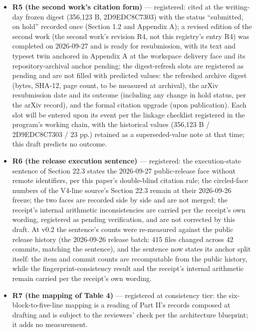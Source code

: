 \documentclass[11pt]{article}
\begin{document}
\begin{itemize}[leftmargin=1.6em,itemsep=2pt,parsep=0pt,topsep=3pt]
citations (E-40.1, E-40.2). The registration follows the R1–R3 precedent of concise, registered facts: the source documents are not transcribed, none of them enters the References, and the confidential-source discipline of C.4 is unaffected—the calibration note and the weekly-report family remain outside the citation surface, carried by fingerprint only.
\item \textbf{R5 (the second work's citation form)} — registered: cited at the writing-day frozen digest (356,123 B, 2D9EDC8C7303) with the status ``submitted, on hold'' recorded once (Section 1.2 and Appendix A); a revised edition of the second work (the second work's revision R4, not this registry's entry R4) was completed on 2026-09-27 and is ready for resubmission, with its text and typeset twin anchored in Appendix A at the workspace delivery face and its repository-archival anchor pending; the digest-refresh slots are registered as pending and are not filled with predicted values: the refreshed archive digest (bytes, SHA-12, page count, to be measured at archival), the arXiv resubmission date and its outcome (including any change in hold status, per the arXiv record), and the formal citation upgrade (upon publication). Each slot will be entered upon its event per the linkage checklist registered in the program's working chain, with the historical values (356,123 B / 2D9EDC8C7303 / 23 pp.) retained as a superseded-value note at that time; this draft predicts no outcome.
\item \textbf{R6 (the release execution sentence)} — registered: the execution-state sentence of Section 22.3 states the 2026-09-27 public-release face without remote identifiers, per this paper's double-blind citation rule; the circled-face numbers of the V4-line source's Section 22.3 remain at their 2026-09-26 freeze; the two faces are recorded side by side and are not merged; the receipt's internal arithmetic inconsistencies are carried per the receipt's own wording, registered as pending verification, and are not corrected by this draft. At v0.2 the sentence's counts were re-measured against the public release history (the 2026-09-26 release batch: 415 files changed across 42 commits, matching the sentence), and the sentence now states its anchor split itself: the item and commit counts are recomputable from the public history, while the fingerprint-consistency result and the receipt's internal arithmetic remain carried per the receipt's own wording.
\item \textbf{R7 (the mapping of Table 4)} — registered at consistency tier: the six-block-to-five-line mapping is a reading of Part II's records composed at drafting and is subject to the reviewers' check per the architecture blueprint; it adds no measurement.

\end{itemize}
\end{document}
